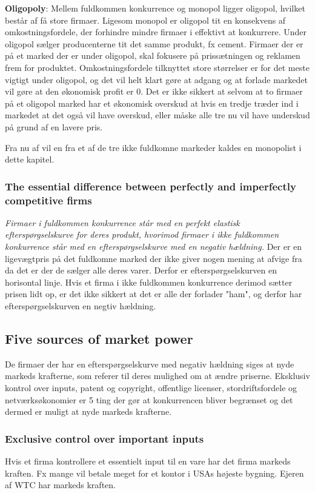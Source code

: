 \textbf{Oligopoly}: Mellem fuldkommen konkurrence og monopol ligger oligopol, hvilket består af få store firmaer. Ligesom monopol er oligopol tit en konsekvens af omkostningsfordele, der forhindre mindre firmaer i effektivt at konkurrere. Under oligopol sælger producenterne tit det samme produkt, fx cement. Firmaer der er på et marked der er under oligopol, skal fokusere på prissætningen og reklamen frem for produktet. Omkostningsfordele tilknyttet store størrelser er for det meste vigtigt under oligopol, og det vil helt klart gøre at adgang og at forlade markedet vil gøre at den økonomisk profit er 0. Det er ikke sikkert at selvom at to firmaer på et oligopol marked har et økonomisk overskud at hvis en tredje træder ind i markedet at det også vil have overskud, eller måske alle tre nu vil have underskud på grund af en lavere pris. 

Fra nu af vil en fra et af de tre ikke fuldkomne markeder kaldes en monopolist i dette kapitel.

\subsubsection{The essential difference between perfectly and imperfectly competitive firms}

\textit{Firmaer i fuldkommen konkurrence står med en perfekt elastisk efterspørgselskurve for deres produkt, hvorimod firmaer i ikke fuldkommen konkurrence står med en efterspørgselskurve med en negativ hældning.} Der er en ligevægtpris på det fuldkomne marked der ikke giver nogen mening at afvige fra da det er der de sælger alle deres varer. Derfor er efterspørgselskurven en horisontal linje. Hvis et firma i ikke fuldkommen konkurrence derimod sætter prisen lidt op, er det ikke sikkert at det er alle der forlader "ham", og derfor har efterspørgselskurven en negtiv hældning. 

\subsection{Five sources of market power}
De firmaer der har en efterspørgselskurve med negativ hældning siges at nyde markeds krafterne, som referer til deres mulighed om at ændre priserne. Eksklusiv kontrol over inputs, patent og copyright, offentlige licenser, stordriftsfordele og netværksøkonomier er 5 ting der gør at konkurrencen bliver begrænset og det dermed er muligt at nyde markeds krafterne. 

\subsubsection{Exclusive control over important inputs}
Hvis et firma kontrollere et essentielt input til en vare har det firma markeds kraften. Fx mange vil betale meget for et kontor i USAs højeste bygning. Ejeren af WTC har markeds kraften.


